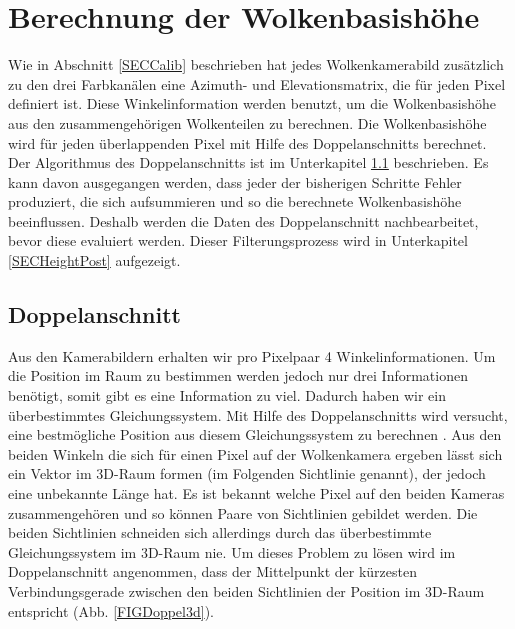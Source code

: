 \documentclass[a4paper,11pt,twoside,german]{article}
\newcommand{\absatz}{\smallbreak}
\begin{document}
\section{Berechnung der Wolkenbasishöhe}
\label{SECHoehenbestimmung}
Wie in Abschnitt \ref{SECCalib} beschrieben hat jedes Wolkenkamerabild
zusätzlich zu den drei Farbkanälen eine Azimuth- und Elevationsmatrix, die für
jeden Pixel definiert ist. Diese Win\-kel\-in\-for\-ma\-tion werden benutzt, um
die Wolkenbasishöhe aus den zusammengehörigen Wolkenteilen zu berechnen. Die
Wolkenbasishöhe wird für jeden überlappenden Pixel mit Hilfe des
Doppelanschnitts berechnet. Der Algorithmus des Doppelanschnitts ist im
Unterkapitel \ref{SECDoppel} beschrieben. Es kann davon ausgegangen werden, dass
jeder der bisherigen Schritte Fehler produziert, die sich aufsummieren und so
die berechnete Wolkenbasishöhe beeinflussen. Deshalb werden die Daten des
Doppelanschnitt nachbearbeitet, bevor diese evaluiert werden. Dieser
Filterungsprozess wird in Unterkapitel \ref{SECHeightPost} aufgezeigt.

\subsection{Doppelanschnitt}
\label{SECDoppel} Aus den Kamerabildern erhalten wir pro Pixelpaar 4
Winkelinformationen. Um die Position im Raum zu bestimmen werden jedoch nur drei
Informationen benötigt, somit gibt es eine Information zu viel. Dadurch haben
wir ein überbestimmtes Gleichungssystem. Mit Hilfe des Doppelanschnitts wird
versucht, eine bestmögliche Position aus diesem Gleichungssystem zu berechnen
\citep{lange_16_praktikum}.  \clearpage Aus den beiden Winkeln die sich für
einen Pixel auf der Wolkenkamera ergeben lässt sich ein Vektor im 3D-Raum formen
(im Folgenden Sichtlinie genannt), der jedoch eine unbekannte Länge hat. Es ist
bekannt welche Pixel auf den beiden Kameras zusammengehören und so können Paare
von Sichtlinien gebildet werden. Die beiden Sichtlinien schneiden sich
allerdings durch das überbestimmte Gleichungssystem im 3D-Raum nie. Um dieses
Problem zu lösen wird im Doppelanschnitt angenommen, dass der Mittelpunkt der
kürzesten Verbindungsgerade zwischen den beiden Sichtlinien der Position im
3D-Raum entspricht (Abb. \ref{FIGDoppel3d}).\absatz 
\end{document}
